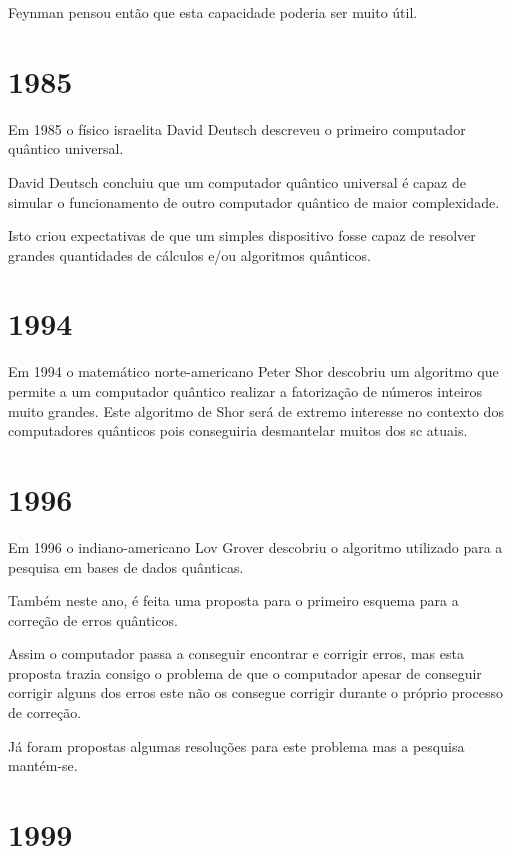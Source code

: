 \documentclass{report}
\begin{document}
	Feynman pensou então que esta capacidade poderia ser muito útil.

\section{1985}


	Em 1985 o físico israelita David Deutsch descreveu o primeiro computador quântico universal.

	David Deutsch concluiu que  um computador quântico universal é capaz de simular o funcionamento de outro computador quântico de maior complexidade.

	Isto criou expectativas de que um simples dispositivo fosse capaz de resolver grandes quantidades de cálculos e/ou algoritmos quânticos.

\section{1994}
\label{subsec.chap}

	Em 1994 o matemático norte-americano Peter Shor descobriu um algoritmo que permite a um computador quântico realizar a fatorização de números inteiros muito grandes. Este algoritmo de Shor será de extremo interesse no contexto dos computadores quânticos pois conseguiria desmantelar muitos dos \ac{sc} atuais.

\newpage

\section{1996}

	Em 1996 o indiano-americano Lov Grover descobriu o algoritmo utilizado para a pesquisa em bases de dados quânticas.

	Também neste ano, é feita uma proposta para o primeiro esquema para a correção de erros quânticos.

	Assim o computador passa a conseguir encontrar e corrigir erros, mas esta proposta trazia consigo o problema de que o computador apesar de conseguir corrigir alguns dos erros este não os consegue corrigir durante o próprio processo de correção.

	Já foram propostas algumas resoluções para este problema mas a pesquisa mantém-se.

\section{1999}
\end{document}
